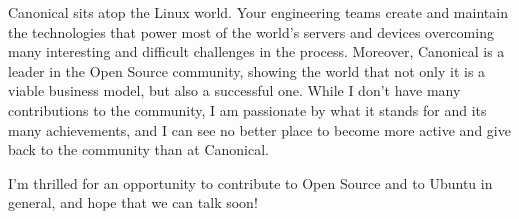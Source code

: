 \documentclass[11pt, a4paper]{awesome-cv}
\begin{document}
\begin{cvletter}
Canonical sits atop the Linux world. Your engineering teams create and maintain the technologies that power most of the world's servers and devices overcoming many interesting and difficult challenges in the process. Moreover, Canonical is a leader in the Open Source community, showing the world that not only it is a viable business model, but also a successful one. While I don't have many contributions to the community, I am passionate by what it stands for and its many achievements, and I can see no better place to become more active and give back to the community than at Canonical. 

I'm thrilled for an opportunity to contribute to Open Source and to Ubuntu in general, and hope that we can talk soon!

\end{cvletter}

\makeletterclosing
\end{document}
